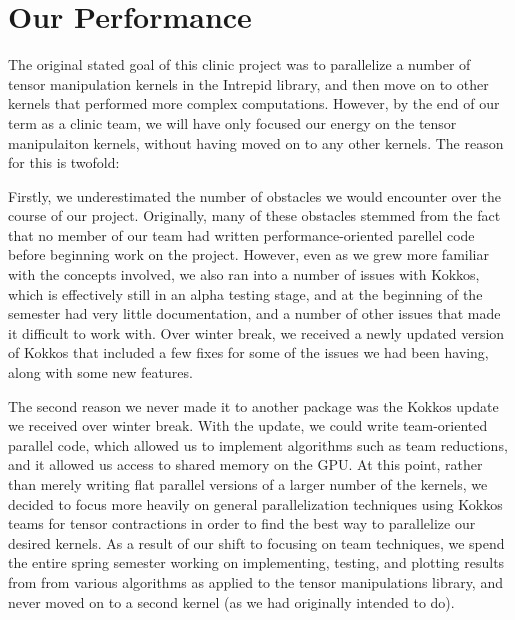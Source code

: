 
\chapter{Our Performance}

The original stated goal of this clinic project was to parallelize a number of tensor manipulation 
kernels in the Intrepid library, and then move on to other kernels that performed more complex 
computations. However, by the end of our term as a clinic team, we will have only focused our 
energy on the tensor manipulaiton kernels, without having moved on to any other kernels. The 
reason for this is twofold:

Firstly, we underestimated the number of obstacles we would encounter over the course of our project. 
Originally, many of these obstacles stemmed from the fact that no member of our team had written 
performance-oriented parellel code before beginning work on the project. However, even as we grew more 
familiar with the concepts involved, we also ran into a number of issues with Kokkos, which is effectively 
still in an alpha testing stage, and at the beginning of the semester had very little documentation, and 
a number of other issues that made it difficult to work with. Over winter break, we received a newly updated 
version of Kokkos that included a few fixes for some of the issues we had been having, along with some new 
features.

The second reason we never made it to another package was the Kokkos update we received over winter break.
With the update, we could write team-oriented parallel code, which allowed us to implement algorithms such as
team reductions, and it allowed us access to shared memory on the GPU. At this point, rather than merely writing 
flat parallel versions of a larger number of the kernels, we decided to focus more heavily on general parallelization
techniques using Kokkos teams for tensor contractions in order to find the best way to parallelize our desired kernels.
As a result of our shift to focusing on team techniques, we spend the entire spring semester working on 
implementing, testing, and plotting results from from various algorithms as applied to the tensor manipulations library, 
and never moved on to a second kernel (as we had originally intended to do).

